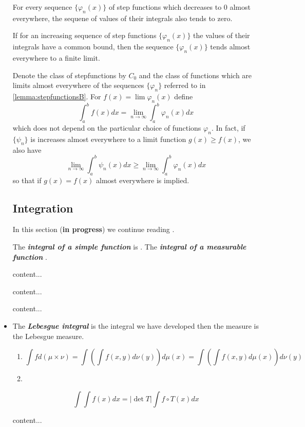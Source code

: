 \documentclass{article}
\theoremstyle{definition}
\numberwithin{equation}{section}
\begin{document}
\begin{itemize}
		\begin{lemma}\label{lemma:stepfunctionsA}
			For every sequence $\{\varphi_n(x)\}$ of step functions which decreases to 0 almost everywhere, the sequene of values of their integrals also tends to zero.
		\end{lemma}
		\begin{lemma}\label{lemma:stepfunctionsB}
			If for an increasing sequence of step functions $\{\varphi_n(x)\}$ the values of their integrals have a common bound, then the sequence $\{\varphi_n(x)\}$ tends almost everywhere to a finite limit.
		\end{lemma}
		Denote the class of stepfunctions by $C_0$ and the class of functions which are limits almost everywhere of the sequences $\{\varphi_n\}$ referred to in \cref{lemma:stepfunctionsB}. For $f(x)=\lim\varphi_n(x)$ define
		\[\int_a^bf(x)dx=\lim_{n\to \infty}\int_a^b\varphi_n(x)dx\]
		which does not depend on the particular choice of functions $\varphi_n$. In fact, if $\{\psi_n\}$ is increases almost everywhere to a limit function $g(x)\geq f(x)$, we also have
		\[\lim_{n\to\infty}\int_a^b\psi_n(x)dx\geq\lim_{n\to\infty}\int_a^b\varphi_n(x)dx\]
		so that if $g(x)=f(x)$ almost everywhere is implied.
		\subsection{Integration}
		In this section (\textbf{in progress}) we continue reading \cite{folland}.
		
		The \textbf{\textit{integral of a simple function}} is . The \textbf{\textit{integral of a measurable function}} .
		\begin{thm}
			content...
		\end{thm}
		\begin{thm}
			content...
		\end{thm}
		\begin{prop}
			content...
		\end{prop}
		\item The \textbf{\textit{Lebesgue integral}} is the integral we have developed then the measure is the Lebesgue measure.
		\begin{thm}\leavevmode
			\begin{enumerate}
				\item \[\int fd(\mu\times\nu)=\int\left(\int f(x,y)d\nu(y)\right)d\mu(x)=\int\left(\int f(x,y)d\mu(x)\right)d\nu(y)\]
				\item 
			\end{enumerate}
		\end{thm}
		\begin{thm}[2.44]
			\[\int \int f(x)dx=|\det T|\int f\circ T(x)dx\]
		\end{thm}
		\begin{thm}[2.47, diffeomorphisms]
			content...
		\end{thm}

		\end{itemize}
\end{document}
